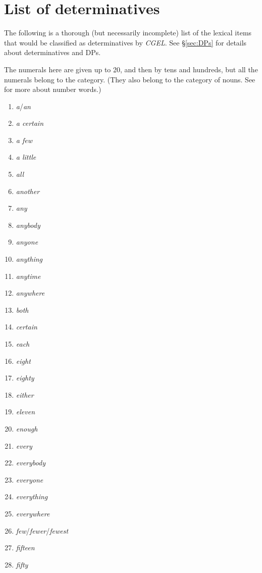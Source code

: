 \chapter{List of determinatives}

The following is a thorough (but necessarily incomplete) list of the lexical items that would be classified as determinatives by \textit{CGEL}. See \S\ref{sec:DPs} for details about determinatives and DPs.

The numerals here are given up to 20, and then by tens and hundreds, but all the numerals belong to the category. (They also belong to the  category of nouns. See \textcite{reynolds:unpublished} for more about number words.)

\begin{multicols}{3}
\begin{enumerate}[noitemsep]
    \item\textit{a}/\textit{an}
\item\textit{a certain}
\item\textit{a few}
\item\textit{a little}
\item\textit{all}
\item\textit{another}
\item\textit{any}
\item\textit{anybody}
\item\textit{anyone}
\item\textit{anything}
\item\textit{anytime}
\item\textit{anywhere}
\item\textit{both}
\item\textit{certain}
\item\textit{each}
\item\textit{eight}
\item\textit{eighty}
\item\textit{either}
\item\textit{eleven}
\item\textit{enough}
\item\textit{every}
\item\textit{everybody}
\item\textit{everyone}
\item\textit{everything}
\item\textit{everywhere}
\item\textit{few}/\textit{fewer}/\textit{fewest}
\item\textit{fifteen}
\item\textit{fifty}

\end{enumerate}
\end{multicols}
